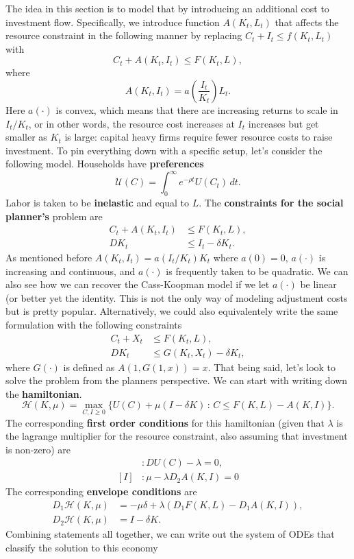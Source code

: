 \documentclass[11pt,english]{article}
\begin{document}
The idea in this section is to model that by introducing an additional cost to investment flow. Specifically, we introduce function $A(K_t, L_t)$ that affects the resource constraint in the following manner by replacing $C_t + I_t \leq f(K_t, L_t)$ with $$C_t + A(K_t, I_t) \leq F(K_t, L),$$ where $$A(K_t, I_t) = a\left(\frac{I_t}{K_t}\right)L_t.$$Here $a(\cdot)$ is convex, which means that there are increasing returns to scale in $I_t/K_t$, or in other words, the resource cost increases at $I_t$ increases but get smaller as $K_t$ is large: capital heavy firms require fewer resource costs to raise investment. To pin everything down with a specific setup, let's consider the following model. Households have \textbf{preferences} $$\mathcal{U}(C) = \int_0^\infty e^{-\rho t} U(C_t)\,dt.$$ Labor is taken to be \textbf{inelastic} and equal to $L$. The \textbf{constraints for the social planner's} problem are \begin{align*}
C_t + A(K_t, I_t) &\leq F(K_t, L),\\
DK_t &\leq I_t - \delta K_t.
\end{align*}
As mentioned before $A(K_t, I_t) = a\left(I_t / K_t\right)K_t$ where $a(0) = 0$, $a(\cdot)$ is increasing and continuous, and $a(\cdot)$ is frequently taken to be quadratic. We can also see how we can recover the Cass-Koopman model if we let $a(\cdot)$ be linear (or better yet the identity. This is not the only way of modeling adjustment costs but is pretty popular. Alternatively, we could also equivalentely write the same formulation with the following constraints \begin{align*}
C_t +X_t &\leq F(K_t, L),\\
DK_t &\leq G(K_t, X_t) - \delta K_t,
\end{align*} where $G(\cdot)$ is defined as $A(1, G(1, x)) = x$. That being said, let's look to solve the problem from the planners perspective. We can start with writing down the \textbf{hamiltonian}.
$$\mathcal{H}(K, \mu) = \max_{C,I \geq 0}\{U(C) + \mu(I - \delta K)\,:\, C \leq F(K, L) - A(K,I)\}.$$The corresponding \textbf{first order conditions} for this hamiltonian (given that $\lambda$ is the lagrange multiplier for the resource constraint, also assuming that investment is non-zero) are
\begin{align*}
[C]&:DU(C) - \lambda = 0,\\
[I]&:\mu - \lambda D_2A(K, I) = 0
\end{align*}The corresponding \textbf{envelope conditions} are
\begin{align*}
D_1\mathcal{H}(K, \mu) &= - \mu\delta + \lambda(D_1F(K, L) - D_1A(K, I)),\\
D_2\mathcal{H}(K, \mu) &= I - \delta K.
\end{align*} Combining statements all together, we can write out the system of ODEs that classify the solution to this economy
\end{document}
